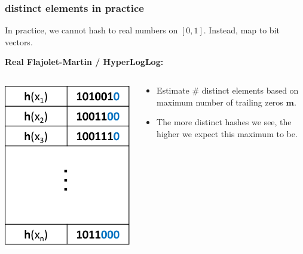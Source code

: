 \documentclass[handout,compress]{beamer}
\newcommand{\bv}[1]{\mathbf{#1}}
\begin{document}
\begin{frame}
	\frametitle{distinct elements in practice}
	In practice, we cannot hash to real numbers on $[0,1]$. Instead, map to bit vectors.
	
	\textbf{Real Flajolet-Martin / HyperLogLog:}
	\begin{columns}
		\begin{column}{.4\textwidth}
			\begin{center}
				\includegraphics[width=.7\textwidth]{loglog2.png}
			\end{center}
		\end{column}
		\begin{column}{.6\textwidth}
				\begin{itemize}
					\item Estimate \# distinct elements based on maximum number of trailing zeros $\bv m$.
					\item The more distinct hashes we see, the higher we expect this maximum to be.
				\end{itemize}
		\end{column}
	\end{columns}
	\begin{center}
	\end{center}
\end{frame}
\end{document}
